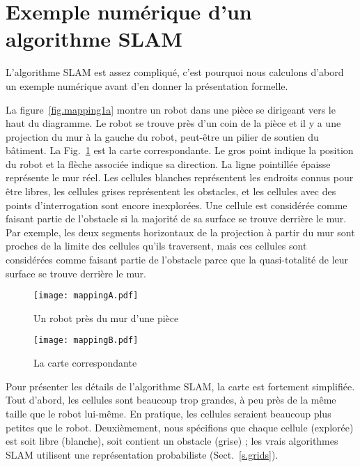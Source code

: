 \section{Exemple numérique d'un algorithme SLAM}\label{s.slam-numerical}

L'algorithme SLAM est assez compliqué, c'est pourquoi nous calculons d'abord un exemple numérique avant d'en donner la présentation formelle.

La figure~\ref{fig.mapping1a} montre un robot dans une pièce se dirigeant vers le haut du diagramme. Le robot se trouve près d'un coin de la pièce et il y a une projection du mur à la gauche du robot, peut-être un pilier de soutien du bâtiment. La Fig.~\ref{fig.mapping1b} est la carte correspondante. Le gros point indique la position du robot et la flèche associée indique sa direction. La ligne pointillée épaisse représente le mur réel. Les cellules blanches représentent les endroits connus pour être libres, les cellules grises représentent les obstacles, et les cellules avec des points d'interrogation sont encore inexplorées. Une cellule est considérée comme faisant partie de l'obstacle si la majorité de sa surface se trouve derrière le mur. Par exemple, les deux segments horizontaux de la projection à partir du mur sont proches de la limite des cellules qu'ils traversent, mais ces cellules sont considérées comme faisant partie de l'obstacle parce que la quasi-totalité de leur surface se trouve derrière le mur.

\begin{figure}
\begin{minipage}{.45\textwidth}
\texttt{[image: mappingA.pdf]}
\caption{Un robot près du mur d'une pièce}
\label{fig.mapping1a}
\end{minipage}
\hspace{\fill}
\begin{minipage}{.45\textwidth}
\texttt{[image: mappingB.pdf]}
\caption{La carte correspondante}
\label{fig.mapping1b}
\end{minipage}
\end{figure}

Pour présenter les détails de l'algorithme SLAM, la carte est fortement simplifiée. Tout d'abord, les cellules sont beaucoup trop grandes, à peu près de la même taille que le robot lui-même. En pratique, les cellules seraient beaucoup plus petites que le robot. Deuxièmement, nous spécifions que chaque cellule (explorée) est soit libre (blanche), soit contient un obstacle (grise) ; les vrais algorithmes SLAM utilisent une représentation probabiliste (Sect.~\ref{s.grids}).

